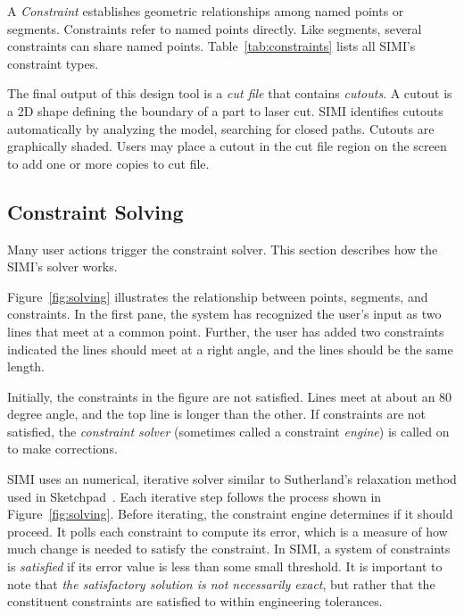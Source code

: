 
A \textit{Constraint} establishes geometric relationships among named
points or segments. Constraints refer to named points directly. Like
segments, several constraints can share named
points. Table~\ref{tab:constraints} lists all SIMI's constraint types.


The final output of this design tool is a \textit{cut file} that
contains \textit{cutouts}. A cutout is a 2D shape defining the
boundary of a part to laser cut. SIMI identifies cutouts automatically
by analyzing the model, searching for closed paths. Cutouts are
graphically shaded. Users may place a cutout in the cut file region on
the screen to add one or more copies to cut file.

\subsection{Constraint Solving}

Many user actions trigger the constraint solver. This section
describes how the SIMI's solver works.

Figure~\ref{fig:solving} illustrates the relationship between points,
segments, and constraints. In the first pane, the system has
recognized the user's input as two lines that meet at a common
point. Further, the user has added two constraints indicated the lines
should meet at a right angle, and the lines should be the same length.

Initially, the constraints in the figure are not satisfied. Lines meet
at about an 80 degree angle, and the top line is longer than the
other. If constraints are not satisfied, the \textit{constraint
  solver} (sometimes called a constraint \textit{engine}) is called on
to make corrections.

SIMI uses an numerical, iterative solver similar to Sutherland's
relaxation method used in Sketchpad~\cite{sutherland-sketchpad}. Each
iterative step follows the process shown in
Figure~\ref{fig:solving}. Before iterating, the constraint engine
determines if it should proceed. It polls each constraint to compute
its error, which is a measure of how much change is needed to satisfy
the constraint. In SIMI, a system of constraints is \textit{satisfied}
if its error value is less than some small threshold. It is important
to note that \textit{the satisfactory solution is not necessarily
  exact}, but rather that the constituent constraints are satisfied to
within engineering tolerances.

